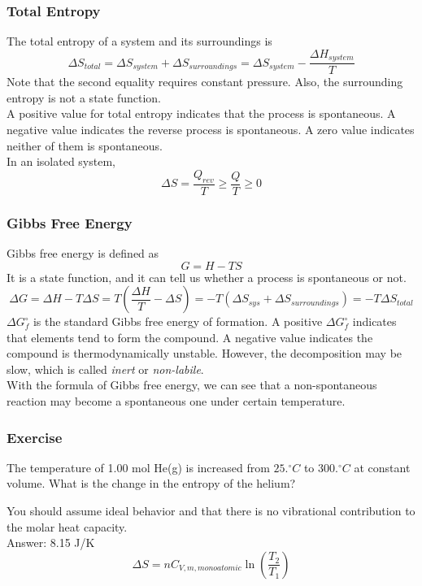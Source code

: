 \documentclass[aspectratio=169]{beamer}
\def\blankline{\\[6pt]}
\begin{document}
  \begin{frame}
    \frametitle{Total Entropy}
    The total entropy of a system and its surroundings is
    \begin{equation*}
      \Delta S_{total} = \Delta S_{system} + \Delta S_{surroundings} = \Delta S_{system} - \frac{\Delta H_{system}}{T}
    \end{equation*}
    Note that the second equality requires constant pressure. Also, the surrounding entropy is not a state function.
    \blankline
    A positive value for total entropy indicates that the process is spontaneous. A negative value indicates the reverse process is spontaneous.
    A zero value indicates neither of them is spontaneous.
    \blankline
    In an isolated system, 
    \begin{equation*}
      \Delta S = \frac{Q_{rev}}{T}\geq \frac{Q}{T}\geq 0
    \end{equation*}
  \end{frame}
  \begin{frame}
    \frametitle{Gibbs Free Energy}
    Gibbs free energy is defined as
    \begin{equation*}
      G = H - TS
    \end{equation*}
    It is a state function, and it can tell us whether a process is spontaneous or not.
    \begin{equation*}
      \Delta G = \Delta H - T\Delta S = T(\frac{\Delta H}{T} - \Delta S) = -T(\Delta S_{sys} + \Delta S_{surroundings}) = -T\Delta S_{total}
    \end{equation*}
    $\Delta G_f^{\circ}$ is the standard Gibbs free energy of formation. A positive $\Delta G_{f}^{\circ}$ indicates that elements tend to form the 
    compound. A negative value indicates the compound is thermodynamically unstable. However, the decomposition may be slow, which is called \textit{inert} or \textit{non-labile}.
    \blankline
    With the formula of Gibbs free energy, we can see that a non-spontaneous reaction may become a spontaneous one under certain temperature.

  \end{frame}
  \begin{frame}
    \frametitle{Exercise}
    The temperature of 1.00 mol He(g) is increased from $25.^{\circ}C$ to $300.^{\circ}C$ at constant volume. What is the 
    change in the entropy of the helium?
    
    You should assume ideal behavior and that there is no vibrational contribution to the molar heat capacity.
    \pause
    \blankline
    Answer: 8.15 J/K
    $$\Delta S = nC_{V, m, monoatomic}\ln(\frac{T_2}{T_1}) $$
  \end{frame}
\end{document}
